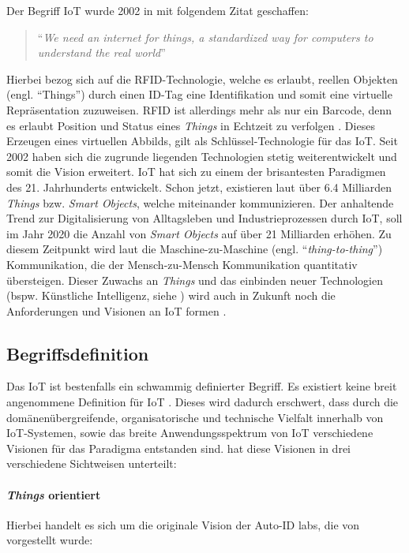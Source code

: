 Der Begriff \ac{IoT} wurde 2002 in \cite{ashton2009internet} mit folgendem Zitat geschaffen:
\begin{quote}
    "`\textit{We need an internet for things, a standardized way for computers to understand the real world}"'
\end{quote}
 Hierbei bezog sich \cite{ashton2009internet} auf die RFID-Technologie, welche es erlaubt, reellen Objekten (engl. "`Things"') durch einen ID-Tag eine Identifikation und somit eine virtuelle Repräsentation zuzuweisen. RFID ist allerdings mehr als nur ein Barcode, denn es erlaubt Position und Status eines \textit{Things} in Echtzeit zu verfolgen \cite{atzori2010internet}. Dieses Erzeugen eines virtuellen Abbilds, gilt als Schlüssel-Technologie für das \ac{IoT}. Seit 2002 haben sich die zugrunde liegenden Technologien stetig weiterentwickelt und somit die Vision erweitert. \ac{IoT} hat sich zu einem der brisantesten Paradigmen des 21. Jahrhunderts entwickelt. Schon jetzt, existieren laut \cite{gartnerIoT} über 6.4 Milliarden \textit{Things} bzw. \textit{Smart Objects}, welche miteinander kommunizieren. Der anhaltende Trend zur Digitalisierung von Alltagsleben und Industrieprozessen durch \ac{IoT}, soll im Jahr 2020 die Anzahl von \textit{Smart Objects} auf über 21 Milliarden erhöhen. Zu diesem Zeitpunkt wird laut \cite{tan2010future} die Maschine-zu-Maschine (engl. "`\textit{thing-to-thing}"') Kommunikation, die der Mensch-zu-Mensch Kommunikation quantitativ übersteigen. Dieser Zuwachs an \textit{Things} und das einbinden neuer Technologien (bspw. Künstliche Intelligenz, siehe \cite{mehdi2017deeplearningIoT}) wird auch in Zukunft noch die Anforderungen und Visionen an \ac{IoT} formen \cite{Gubbi.2013}.
 
\subsection{Begriffsdefinition}
Das \acl{IoT} ist bestenfalls ein schwammig definierter Begriff. Es existiert keine breit angenommene Definition für \ac{IoT} \cite{atzori2010internet}. Dieses wird dadurch erschwert, dass durch die domänenübergreifende, organisatorische und technische Vielfalt innerhalb von \ac{IoT}-Systemen, sowie das breite Anwendungsspektrum von \ac{IoT} verschiedene Visionen für das Paradigma entstanden sind. \cite{atzori2010internet} hat diese Visionen in drei verschiedene Sichtweisen unterteilt: 

\paragraph{\textit{Things} orientiert} Hierbei handelt es sich um die originale Vision der Auto-ID labs, die von \cite{sarma2000networked} vorgestellt wurde:

